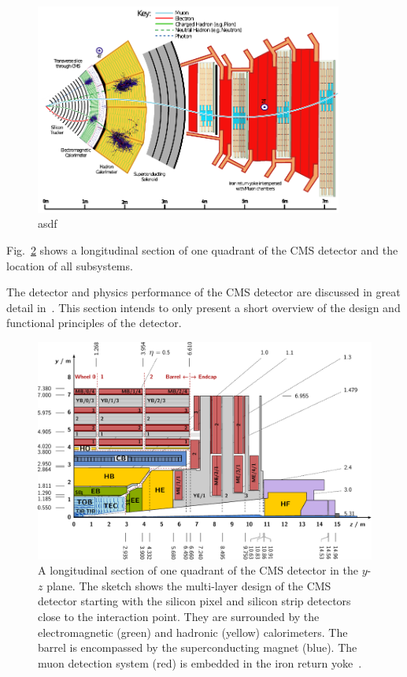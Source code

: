 \begin{figure}[htp]
    \centering
    \includegraphics[width=0.9\textwidth]{figures/cms_detector/cms_slice.pdf}
    \caption[Transverse slice of the CMS detector]{asdf}
    \label{fig:cms:transverse_slice}
\end{figure}


Fig.~\ref{fig:cms:longitudinal_section} shows a longitudinal section of one
quadrant of the CMS detector and the location of all subsystems.

The detector and physics performance of the CMS detector are discussed in great
detail in~\cite{Bayatian:922757,Ball:2007zza,Chatrchyan:2008aa}. This section
intends to only present a short overview of the design and functional principles
of the detector.

\begin{figure}[htp]
    \centering
    \includegraphics[width=1.0\textwidth]{figures/cms_detector/cms_longitudinal_section.pdf}
    \caption[Longitudinal section of the CMS
    detector]{A longitudinal section of one quadrant of the CMS
        detector in the $y$-$z$ plane. The sketch shows
    the multi-layer design of the CMS detector starting with the silicon pixel
and silicon strip detectors close to the interaction point. They are surrounded
by the electromagnetic (green) and hadronic (yellow) calorimeters. The barrel is
encompassed by the superconducting magnet (blue). The muon detection system
(red) is embedded in the iron return yoke~\cite{Berger:2014aca}.}
    \label{fig:cms:longitudinal_section}
\end{figure}

